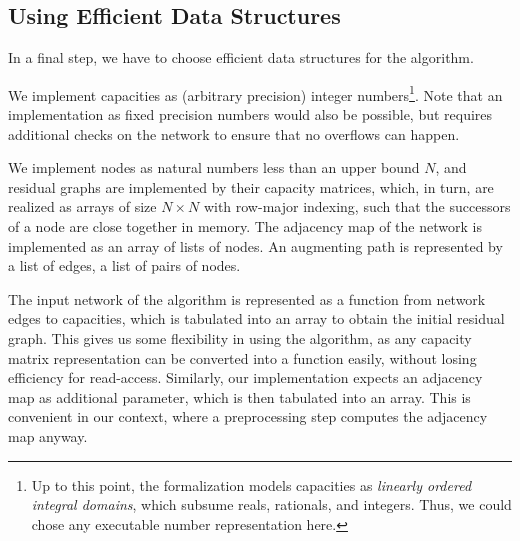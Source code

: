 \documentclass{llncs}
\newcommand{\isai}{\lstinline[language=isabelle,basicstyle=\normalsize\ttfamily\slshape]}
\begin{document}
  \subsection{Using Efficient Data Structures}\label{sec:impl_data_structures}
  In a final step, we have to choose efficient data structures for the algorithm. 

  
  We implement capacities as (arbitrary precision) integer numbers\footnote{Up to this point, the formalization models capacities as \emph{linearly ordered integral domains}, which subsume reals, rationals, and integers. Thus, we could chose any executable number representation here.}. Note that an implementation as fixed precision numbers would also be possible,
  but requires additional checks on the network to ensure that no overflows can happen. 
  
  We implement nodes as natural numbers less than an upper bound $N$, and residual graphs are implemented by their capacity matrices, which, in turn,
  are realized as arrays of size $N\times N$ with row-major indexing, such that the successors of a node are close together in memory.
  The adjacency map of the network is implemented as an array of lists of nodes. 
  An augmenting path is represented by a list of edges, \ie a list of pairs of nodes. 
  
  
  
  
  The input network of the algorithm is represented as a function from network edges to capacities, which is tabulated into an array
  to obtain the initial residual graph. This gives us some flexibility in using the algorithm, as any capacity matrix representation can be converted into a 
  function easily, without losing efficiency for read-access. 
  Similarly, our implementation expects an adjacency map as additional parameter, which is then tabulated into an array. This is convenient in our context, where a preprocessing step computes the adjacency map anyway.
      
\end{document}
